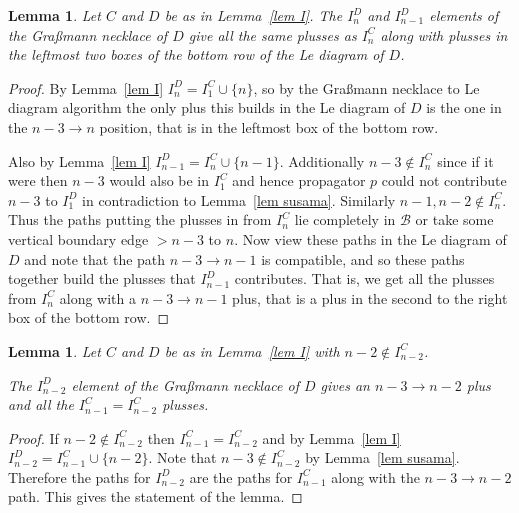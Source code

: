 \documentclass[11pt]{article}
\newtheorem{lem}[thm]{Lemma}
\theoremstyle{remark}
\theoremstyle{definition}
\begin{document}
\begin{lem}\label{lem n and n-1}
  Let $C$ and $D$ be as in Lemma~\ref{lem I}.
  The $I_n^{D}$ and $I_{n-1}^{D}$ elements of the Gra\ss mann necklace of $D$ give all the same plusses as $I_n^{C}$ along with plusses in the leftmost two boxes of the bottom row of the Le diagram of $D$.
\end{lem}

\begin{proof}
  By Lemma~\ref{lem I} $I_n^{D}= I_1^{C} \cup \{n\}$, so by the Gra\ss mann necklace to Le diagram algorithm the only plus this builds in the Le diagram of $D$ is  the one in the $n-3\rightarrow n$ position, that is in the leftmost box of the bottom row.

  Also by Lemma~\ref{lem I} $I_{n-1}^{D} = I_n^{C} \cup \{n-1\}$.  Additionally $n-3\not\in I_{n}^{C}$ since if it were then $n-3$ would also be in $I_1^{C}$ and hence propagator $p$ could not contribute $n-3$ to $I_1^{D}$ in contradiction to Lemma~\ref{lem susama}.  Similarly $n-1, n-2\not\in I_n^{C}$.  Thus the paths putting the plusses in from $I_n^{C}$ lie completely in $\mathcal{B}$ or take some vertical boundary edge $>n-3$ to $n$.   Now view these paths in the Le diagram of $D$ and note that the path $n-3\rightarrow n-1$ is compatible, and so these paths together build the plusses that $I_{n-1}^{D}$ contributes.  That is, we get all the plusses from $I_{n}^{C}$ along with a $n-3\rightarrow n-1$ plus, that is a plus in the second to the right box of the bottom row.
\end{proof}

\begin{lem}\label{lem n-2 good}
  Let $C$ and $D$ be as in Lemma~\ref{lem I} with $n-2 \not\in I_{n-2}^{C}$.

  The $I_{n-2}^{D}$ element of the Gra\ss mann necklace of $D$ gives
  an $n-3\rightarrow n-2$ plus and
  all the $I_{n-1}^{C}=I_{n-2}^{C}$ plusses.
\end{lem}

\begin{proof}
  If $n-2\not\in I_{n-2}^{C}$ then $I_{n-1}^{C}=I_{n-2}^{C}$ and by Lemma~\ref{lem I} $I_{n-2}^{D} = I_{n-1}^{C} \cup \{n-2\}$.  Note that $n-3\not\in I_{n-2}^{C}$ by Lemma~\ref{lem susama}.  Therefore the paths for $I_{n-2}^{D}$ are the paths for $I_{n-1}^{C}$ along with the $n-3\rightarrow n-2$ path.  This gives the statement of the lemma.

\end{proof}
\end{document}
